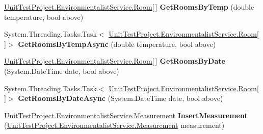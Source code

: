\begin{DoxyCompactItemize}
\item 
\hypertarget{class_unit_test_project_1_1_environmentalist_service_1_1_service1_client_a92b879d67dbfac00f8006b68419a43cc}{}\hyperlink{class_unit_test_project_1_1_environmentalist_service_1_1_room}{Unit\+Test\+Project.\+Environmentalist\+Service.\+Room}\mbox{[}$\,$\mbox{]} {\bfseries Get\+Rooms\+By\+Temp} (double temperature, bool above)\label{class_unit_test_project_1_1_environmentalist_service_1_1_service1_client_a92b879d67dbfac00f8006b68419a43cc}

\item 
\hypertarget{class_unit_test_project_1_1_environmentalist_service_1_1_service1_client_a8ca075762430e2f5f3e446d6aeaa4380}{}System.\+Threading.\+Tasks.\+Task$<$ \hyperlink{class_unit_test_project_1_1_environmentalist_service_1_1_room}{Unit\+Test\+Project.\+Environmentalist\+Service.\+Room}\mbox{[}$\,$\mbox{]}$>$ {\bfseries Get\+Rooms\+By\+Temp\+Async} (double temperature, bool above)\label{class_unit_test_project_1_1_environmentalist_service_1_1_service1_client_a8ca075762430e2f5f3e446d6aeaa4380}

\item 
\hypertarget{class_unit_test_project_1_1_environmentalist_service_1_1_service1_client_a48d00c625678551888ccbf4aa1a868ce}{}\hyperlink{class_unit_test_project_1_1_environmentalist_service_1_1_room}{Unit\+Test\+Project.\+Environmentalist\+Service.\+Room}\mbox{[}$\,$\mbox{]} {\bfseries Get\+Rooms\+By\+Date} (System.\+Date\+Time date, bool above)\label{class_unit_test_project_1_1_environmentalist_service_1_1_service1_client_a48d00c625678551888ccbf4aa1a868ce}

\item 
\hypertarget{class_unit_test_project_1_1_environmentalist_service_1_1_service1_client_a07bb45412773e18cf0a6552b2f4e5fab}{}System.\+Threading.\+Tasks.\+Task$<$ \hyperlink{class_unit_test_project_1_1_environmentalist_service_1_1_room}{Unit\+Test\+Project.\+Environmentalist\+Service.\+Room}\mbox{[}$\,$\mbox{]}$>$ {\bfseries Get\+Rooms\+By\+Date\+Async} (System.\+Date\+Time date, bool above)\label{class_unit_test_project_1_1_environmentalist_service_1_1_service1_client_a07bb45412773e18cf0a6552b2f4e5fab}

\item 
\hypertarget{class_unit_test_project_1_1_environmentalist_service_1_1_service1_client_a23d5f57b841ced60ffa670a677d52efe}{}\hyperlink{class_unit_test_project_1_1_environmentalist_service_1_1_measurement}{Unit\+Test\+Project.\+Environmentalist\+Service.\+Measurement} {\bfseries Insert\+Measurement} (\hyperlink{class_unit_test_project_1_1_environmentalist_service_1_1_measurement}{Unit\+Test\+Project.\+Environmentalist\+Service.\+Measurement} measurement)\label{class_unit_test_project_1_1_environmentalist_service_1_1_service1_client_a23d5f57b841ced60ffa670a677d52efe}


\end{DoxyCompactItemize}
